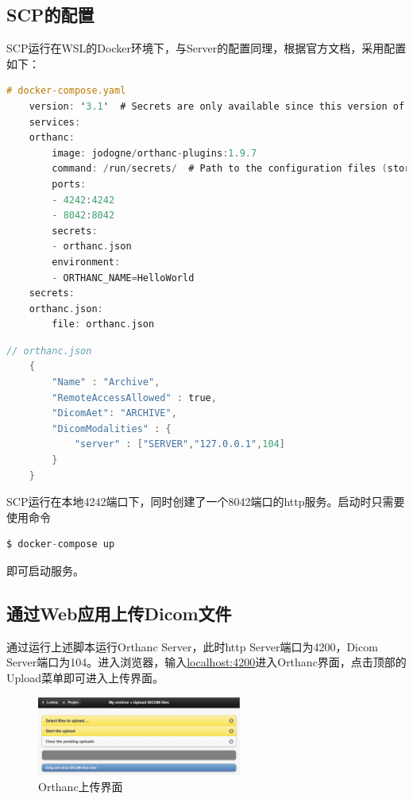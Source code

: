 \documentclass[UTF8]{ctexart}
\begin{document}
\subsection{SCP的配置}
SCP运行在WSL的Docker环境下，与Server的配置同理，根据官方文档\cite{OrthancBook}，采用配置如下：

\begin{lstlisting}[language=C]
    # docker-compose.yaml
    version: '3.1'  # Secrets are only available since this version of Docker Compose
    services:
    orthanc:
        image: jodogne/orthanc-plugins:1.9.7
        command: /run/secrets/  # Path to the configuration files (stored as secrets)
        ports:
        - 4242:4242
        - 8042:8042
        secrets:
        - orthanc.json
        environment:
        - ORTHANC_NAME=HelloWorld
    secrets:
    orthanc.json:
        file: orthanc.json
\end{lstlisting}

\begin{lstlisting}[language=C]
    // orthanc.json
    {
        "Name" : "Archive",
        "RemoteAccessAllowed" : true,
        "DicomAet": "ARCHIVE",
        "DicomModalities" : {
            "server" : ["SERVER","127.0.0.1",104]
        }
    }
\end{lstlisting}
SCP运行在本地4242端口下，同时创建了一个8042端口的http服务。启动时只需要使用命令
\begin{lstlisting}[language=C]
    $ docker-compose up
\end{lstlisting}
即可启动服务。


\subsection{通过Web应用上传Dicom文件}
通过运行上述脚本运行Orthanc Server，此时http Server端口为4200，Dicom Server端口为104。进入浏览器，输入\url{localhost:4200}进入Orthanc界面，点击顶部的Upload菜单即可进入上传界面。

\begin{figure}[H]
    \centering
    \includegraphics[width=0.6\textwidth]{web upload.png}
    \caption{Orthanc上传界面}
    \label{fig:Orthanc Upload}
\end{figure}
\end{document}
